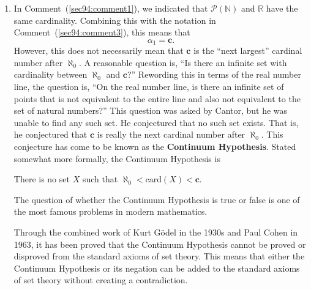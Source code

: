 \begin{enumerate}
\item In Comment~(\ref{sec94:comment1}), we indicated that 
$\mathcal{P} ( \mathbb{N} )$ and $\mathbb{R}$ have the same cardinality.  Combining this with the notation in Comment~(\ref{sec94:comment3}), this means that 
\[
\alpha_1 = \boldsymbol{c}.
\]
However, this does not necessarily mean that $\boldsymbol{c}$ is the ``next largest'' cardinal number after 
$\aleph_0$.  A reasonable question is, ``Is there an infinite set with cardinality between 
$\aleph_0$ and $\boldsymbol{c}$?''  Rewording this in terms of the real number line, the question is, ``On the real number line, is there an infinite set of points that is not equivalent to the entire line and also not equivalent to the set of natural numbers?''  This question was asked by Cantor, but he was unable to find any such set.  He conjectured that no such set exists.  That is, he conjectured that $\boldsymbol{c}$ is really the next cardinal number after 
$\aleph_0$.  This conjecture has come to be known as the \textbf{Continuum Hypothesis}.
%
Stated somewhat more formally, the Continuum Hypothesis is
\begin{center}
There is no set $X$ such that $\aleph_0 < \text{card} ( X ) < \boldsymbol{c}$.
\end{center}
The question of whether the Continuum Hypothesis is true or false is one of the most famous problems in modern mathematics.  

Through the combined work of Kurt G\"{o}del
%
 in the 1930s and Paul Cohen
%
 in 1963, it has been proved that the Continuum Hypothesis cannot be proved or disproved from the standard axioms of set theory.  This means that either the Continuum Hypothesis or its negation can be added to the standard axioms of set theory without creating a contradiction.

\end{enumerate}
\hbreak 


\endinput

